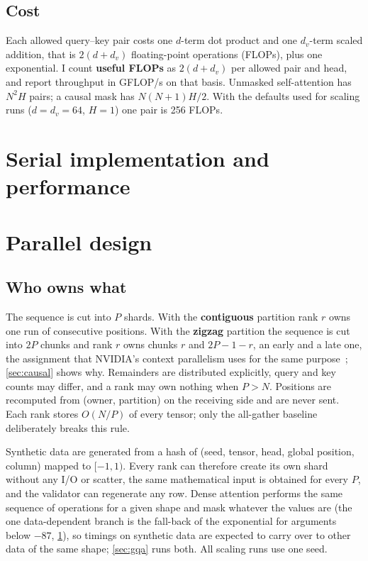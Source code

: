 \documentclass[10pt,a4paper]{article}
\newcommand{\term}[1]{\textbf{#1}}
\begin{document}
\subsection{Cost}
Each allowed query--key pair costs one $d$-term dot product and one $d_v$-term
scaled addition, that is $2(d+d_v)$ floating-point operations (FLOPs), plus one
exponential. I count \term{useful FLOPs} as $2(d+d_v)$ per allowed pair and head,
and report throughput in GFLOP/s on that basis. Unmasked self-attention has
$N^2H$ pairs; a causal mask has $N(N+1)H/2$. With the defaults used for scaling
runs ($d=d_v=64$, $H=1$) one pair is 256 FLOPs.

\section{Serial implementation and performance}\label{sec:serial}


\section{Parallel design}\label{sec:design}

\subsection{Who owns what}
The sequence is cut into $P$ shards. With the \term{contiguous} partition rank $r$
owns one run of consecutive positions. With the \term{zigzag} partition the
sequence is cut into $2P$ chunks and rank $r$ owns chunks $r$ and $2P-1-r$, an early
and a late one, the assignment that NVIDIA's context parallelism uses for the same
purpose~\cite{megatroncp}; \cref{sec:causal} shows why. Remainders are distributed explicitly,
query and key counts may differ, and a rank may own nothing when $P>N$. Positions
are recomputed from (owner, partition) on the receiving side and are never sent.
Each rank stores $O(N/P)$ of every tensor; only the all-gather baseline deliberately
breaks this rule.

Synthetic data are generated from a hash of (seed, tensor, head, global position,
column) mapped to $[-1,1)$. Every rank can therefore create its own shard without
any I/O or scatter, the same mathematical input is obtained for every $P$, and the
validator can regenerate any row. Dense attention performs the same sequence of
operations for a given shape and mask whatever the values are (the one
data-dependent branch is the fall-back of the exponential for arguments below
$-87$, \cref{sec:serial}), so timings on synthetic data are expected to carry over
to other data of the same shape; \cref{sec:gqa} runs both. All scaling runs use
one seed.
\end{document}
